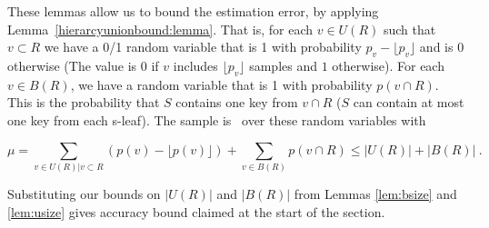 \documentclass[11pt]{article}
\begin{document}
\noindent
These lemmas allow us to bound the estimation error, by applying 
Lemma~\ref{hierarcyunionbound:lemma}.
That is, 
for each $v\in U(R)$ such that $v\subset R$ we have a 0/1 random
variable that is 1 with probability $p_v-\lfloor p_v \rfloor$  and is
$0$ otherwise 
(The value is $0$ if $v$ includes  
$\lfloor p_v \rfloor$ samples and $1$ otherwise).
 For each $v\in B(R)$, we have a random variable that is 1 with
 probability $p(v\cap R)$.  
This is the probability that $S$ contains one key from $v\cap R$ ($S$ can contain at most one key from each s-leaf). 
The sample is \varopt\ over these  random variables with

\vspace*{-1ex}
{\small
$$\mu = \sum_{v\in U(R) | v\subset R} (p(v)-\lfloor p(v) \rfloor) + \sum_{v\in B(R)} p(v\cap R) \leq |U(R)|+|B(R)|\ .$$}

\noindent
Substituting our bounds on $|U(R)|$ and $|B(R)|$ from Lemmas
\ref{lem:bsize} and \ref{lem:usize} gives  accuracy bound
claimed at the start of the section. 
\end{document}
